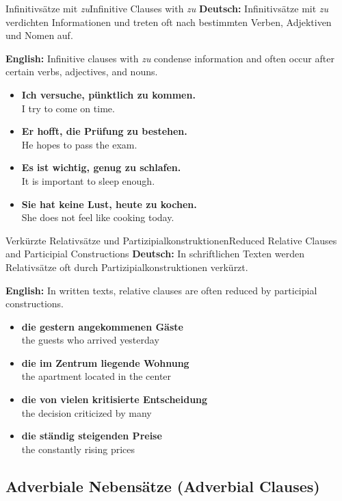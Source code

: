\documentclass[a4paper,11pt]{article}
\newcommand{\GermanText}[1]{\textbf{Deutsch: }#1\par}
\newcommand{\EnglishText}[1]{{\color{SoftGray}\textbf{English: }#1\par}}
\newcommand{\ExampleItem}[2]{\item \textbf{#1}\\{\color{SoftGray}#2}}
\begin{document}
\begin{grammarentry}{Infinitivsätze mit \textit{zu}}{Infinitive Clauses with \textit{zu}}
    \GermanText{Infinitivsätze mit \textit{zu} verdichten Informationen und treten oft nach bestimmten Verben, Adjektiven und Nomen auf.}
    \EnglishText{Infinitive clauses with \textit{zu} condense information and often occur after certain verbs, adjectives, and nouns.}
    \begin{exbox}
        \begin{itemize}
            \ExampleItem{Ich versuche, pünktlich zu kommen.}{I try to come on time.}
            \ExampleItem{Er hofft, die Prüfung zu bestehen.}{He hopes to pass the exam.}
            \ExampleItem{Es ist wichtig, genug zu schlafen.}{It is important to sleep enough.}
            \ExampleItem{Sie hat keine Lust, heute zu kochen.}{She does not feel like cooking today.}
        \end{itemize}
    \end{exbox}
\end{grammarentry}

\begin{grammarentry}{Verkürzte Relativsätze und Partizipialkonstruktionen}{Reduced Relative Clauses and Participial Constructions}
    \GermanText{In schriftlichen Texten werden Relativsätze oft durch Partizipialkonstruktionen verkürzt.}
    \EnglishText{In written texts, relative clauses are often reduced by participial constructions.}
    \begin{exbox}
        \begin{itemize}
            \ExampleItem{die gestern angekommenen Gäste}{the guests who arrived yesterday}
            \ExampleItem{die im Zentrum liegende Wohnung}{the apartment located in the center}
            \ExampleItem{die von vielen kritisierte Entscheidung}{the decision criticized by many}
            \ExampleItem{die ständig steigenden Preise}{the constantly rising prices}
        \end{itemize}
    \end{exbox}
\end{grammarentry}

\subsection{Adverbiale Nebensätze {\small (Adverbial Clauses)}}
\end{document}
